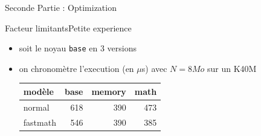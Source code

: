 \documentclass[11pt,mathserif]{beamer}
\begin{document}
\begin{frame}
  \begin{center}
    {\Huge Seconde Partie : Optimization}
  \end{center}
\end{frame}

\begin{frame}{Facteur limitants}{Petite experience}
  \begin{itemize}[<+->]
    \item soit le noyau \texttt{base} en 3 versions
      
    \item on chronomètre l'execution (en $\mu$s) avec $N=8Mo$ sur un K40M
      \begin{center}
        \begin{tabular}{|l|r|r|r|}
          \hline
          modèle    & base    & memory & math  \\ 
          \hline
          normal    &  618    &  390   &  473\\ 
          fastmath  &  546    &  390   &  385 \\ 
          \hline
        \end{tabular}
      \end{center}
  \end{itemize}
\end{frame}
\end{document}
